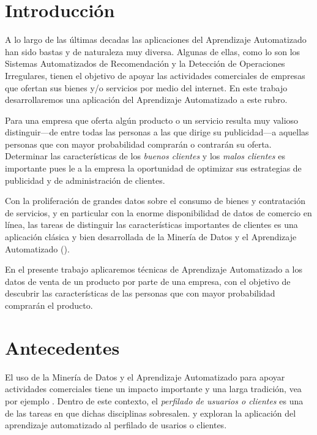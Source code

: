 \documentclass[letterpaper,11pt]{article}
\begin{document}
\begin{multicols}{2}
\section{Introducción}
A lo largo de las últimas decadas las aplicaciones del Aprendizaje Automatizado han sido bastas y de
naturaleza muy diversa. Algunas de ellas, como lo son los Sistemas Automatizados de Recomendación y la Detección de
Operaciones Irregulares, tienen el objetivo de apoyar las actividades comerciales de empresas que ofertan
sus bienes y/o servicios por medio del internet. En este trabajo desarrollaremos una aplicación del Aprendizaje
Automatizado a este rubro.

Para una empresa que oferta algún producto o un servicio resulta muy valioso distinguir---de entre todas
las personas a las que dirige su publicidad---a aquellas personas que con mayor probabilidad comprarán o
contrarán su oferta. Determinar las características de los \emph{buenos clientes} y los \emph{malos clientes} es importante pues 
le a la empresa la oportunidad de optimizar sus estrategias de publicidad y de administración de clientes. 

Con la proliferación de grandes datos sobre el consumo de bienes y contratación de servicios, y en particular con la enorme
disponibilidad de datos de comercio en línea, las tareas de distinguir las características importantes de clientes es
una aplicación clásica y bien desarrollada de la Minería de Datos y el Aprendizaje Automatizado (\cite[Cap. I]{berry}).  

En el presente trabajo aplicaremos técnicas de Aprendizaje Automatizado a los datos de venta de un producto por parte de una empresa, 
con el objetivo de descubrir las características de las personas que con mayor probabilidad comprarán el producto. 


\section{Antecedentes}
El uso de la Minería de Datos y el Aprendizaje Automatizado para apoyar actividades comerciales tiene un impacto
importante y una larga tradición, vea por ejemplo \cite{berry}\cite{big}\cite{tdk}.  Dentro de este contexto, el 
\emph{perfilado de usuarios o clientes} es una de las tareas en que dichas disciplinas sobresalen.
\cite{faw}\cite{discov}\cite{mah}\cite{chen} y \cite{segmen} exploran la aplicación del aprendizaje automatizado al
perfilado de usarios o clientes.


\end{multicols}
\end{document}
